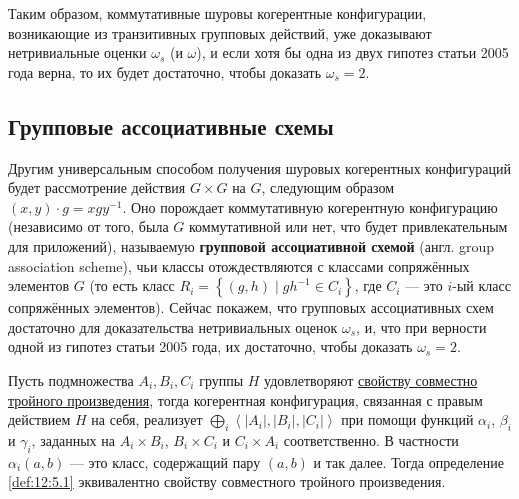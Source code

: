 Таким образом, коммутативные шуровы когерентные конфигурации, возникающие из транзитивных групповых действий, уже доказывают нетривиальные оценки $\omega_s$ (и $\omega$), и если хотя бы одна из двух гипотез статьи 2005 года верна, то их будет достаточно, чтобы доказать $\omega_s = 2$.

\subsection{Групповые ассоциативные схемы}

Другим универсальным способом получения шуровых когерентных конфигураций будет рассмотрение действия $G \times G$ на $G$, следующим образом $(x, y) \cdot g = x g y^{-1}$. Оно порождает коммутативную когерентную конфигурацию (независимо от того, была $G$ коммутативной или нет, что будет привлекательным для приложений), называемую \textbf{групповой ассоциативной схемой} (англ. group association scheme), чьи классы отождествляются с классами сопряжённых элементов $G$ (то есть класс $R_i = \left\{ (g,h) \mid g h^{-1} \in C_i \right\}$, где $C_i$ --- это $i$-ый класс сопряжённых элементов). Сейчас покажем, что групповых ассоциативных схем достаточно для доказательства нетривиальных оценок $\omega_s$, и, что при верности одной из гипотез статьи 2005 года, их достаточно, чтобы доказать $\omega_s = 2$.

Пусть подмножества $A_i, B_i, C_i$ группы $H$ удовлетворяют \hyperref[def:05:5.1]{свойству совместно тройного произведения}, тогда когерентная конфигурация, связанная с правым действием $H$ на себя, реализует $\bigoplus_i \left\langle |A_i|, |B_i|, |C_i| \right\rangle$ при помощи функций $\alpha_i$, $\beta_i$ и $\gamma_i$, заданных на $A_i \times B_i$, $B_i \times C_i$ и $C_i \times A_i$ соответственно. В частности $\alpha_i(a,b)$ --- это класс, содержащий пару $(a,b)$ и так далее. Тогда определение \ref{def:12:5.1} эквивалентно свойству совместного тройного произведения.

